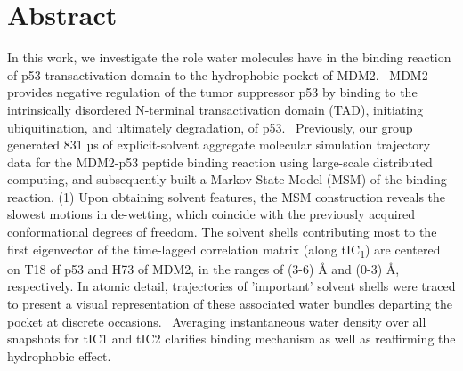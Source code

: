 
\section{Abstract}

In this work, we investigate the role water molecules have in the
binding reaction of p53 transactivation domain to the hydrophobic pocket
of MDM2.~ MDM2 provides negative regulation of the tumor suppressor p53
by binding to the intrinsically disordered N-terminal transactivation
domain (TAD), initiating ubiquitination, and ultimately degradation, of
p53.~ Previously, our group generated 831 µs of explicit-solvent
aggregate molecular simulation trajectory data for the MDM2-p53 peptide
binding reaction using large-scale distributed computing, and
subsequently built a Markov State Model (MSM) of the binding reaction.
(1) Upon obtaining solvent features, the MSM construction reveals the
slowest motions in de-wetting, which coincide with the previously
acquired conformational degrees of freedom. The solvent shells
contributing most to the first eigenvector of the time-lagged
correlation matrix (along tIC\textsubscript{1}) are centered on T18 of
p53 and H73 of MDM2, in the ranges of (3-6) Å and (0-3) Å, respectively.
In atomic detail, trajectories of 'important' solvent shells were traced
to present a visual representation of these associated water bundles
departing the pocket at discrete occasions.~ Averaging instantaneous
water density over all snapshots for tIC1 and tIC2 clarifies binding
mechanism as well as reaffirming the hydrophobic effect.

